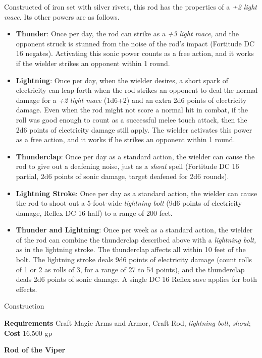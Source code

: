 Constructed of iron set with silver rivets, this rod has the properties of a \textit{+2 light mace}. Its other powers are as follows.
				\begin{itemize}\item  \textbf{Thunder}: Once per day, the rod can strike as a \textit{+3 light mace,} and the opponent struck is stunned from the noise of the rod's impact (Fortitude DC 16 negates). Activating this sonic power counts as a free action, and it works if the wielder strikes an opponent within 1 round.
				\item  \textbf{Lightning}: Once per day, when the wielder desires, a short spark of electricity can leap forth when the rod strikes an opponent to deal the normal damage for a \textit{+2 light mace} (1d6+2) and an extra 2d6 points of electricity damage. Even when the rod might not score a normal hit in combat, if the roll was good enough to count as a successful melee touch attack, then the 2d6 points of electricity damage still apply. The wielder activates this power as a free action, and it works if he strikes an opponent within 1 round.
				\item  \textbf{Thunderclap}: Once per day as a standard action, the wielder can cause the rod to give out a deafening noise, just as a \textit{shout} spell (Fortitude DC 16 partial, 2d6 points of sonic damage, target deafened for 2d6 rounds).
				\item  \textbf{Lightning Stroke}: Once per day as a standard action, the wielder can cause the rod to shoot out a 5-foot-wide \textit{lightning bolt} (9d6 points of electricity damage, Reflex DC 16 half) to a range of 200 feet.
				\item  \textbf{Thunder and Lightning}: Once per week as a standard action, the wielder of the rod can combine the thunderclap described above with a \textit{lightning bolt,} as in the lightning stroke. The thunderclap affects all within 10 feet of the bolt. The lightning stroke deals 9d6 points of electricity damage (count rolls of 1 or 2 as rolls of 3, for a range of 27 to 54 points), and the thunderclap deals 2d6 points of sonic damage. A single DC 16 Reflex save applies for both effects. 
\end{itemize}
				
Construction
				
\textbf{Requirements} Craft Magic Arms and Armor, Craft Rod, \textit{lightning bolt}, \textit{shout}; \textbf{Cost }16,500 gp
				
\textbf{Rod of the Viper}
				
